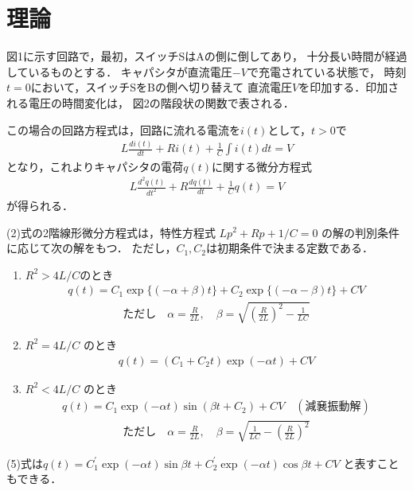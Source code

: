 
\section{理論}

図1に示す回路で，最初，スイッチSはAの側に倒してあり，
十分長い時間が経過しているものとする．
キャパシタが直流電圧$-V$で充電されている状態で，
時刻$t=0$において，スイッチSをBの側へ切り替えて
直流電圧$V$を印加する．印加される電圧の時間変化は，
図2の階段状の関数で表される．

この場合の回路方程式は，回路に流れる電流を$i(t)$として，$t>0$で
\begin{align}
    L \frac{d i(t)}{d t}+R i(t)+\frac{1}{C} \int i(t) d t=V
\end{align}
となり，これよりキャパシタの電荷$q(t)$に関する微分方程式
\begin{align}
    L \frac{d^2 q(t)}{d t^2}+R \frac{d q(t)}{d t}+\frac{1}{C} q(t)=V
\end{align}
が得られる．

(2)式の2階線形微分方程式は，特性方程式 $L p^2+R p+1 / C=0$ 
の解の判別条件に応じて次の解をもつ．
ただし，$C_1, C_2$は初期条件で決まる定数である．

\begin{enumerate}
    \item $R^2>4L/C$のとき
        \begin{align}
            q(t)=C_1 \exp \{(-\alpha+\beta) t\}+C_2 \exp \{(-\alpha-\beta) t\}+C V
        \end{align}
        \begin{align*}
            ただし \quad \alpha=\frac{R}{2 L}, \quad \beta=\sqrt{\left(\frac{R}{2 L}\right)^2-\frac{1}{L C}}
        \end{align*}

    \item $R^2=4 L / C$ のとき
        \begin{align}
            q(t)=\left(C_1+C_2 t\right) \exp (-\alpha t)+C V
        \end{align}

    \item $R^2<4 L / C$ のとき
        \begin{align}
            q(t)=C_1 \exp (-\alpha t) \sin \left(\beta t+C_2\right)+C V\quad(減㐮振動解)
        \end{align}
        \begin{align*}
            ただし \quad \alpha=\frac{R}{2 L}, \quad \beta=\sqrt{\frac{1}{L C}-\left(\frac{R}{2 L}\right)^2}
        \end{align*}
\end{enumerate}

(5)式は$q(t)=C_1^{\prime} \exp (-\alpha t) \sin \beta t+C_2^{\prime} \exp (-\alpha t) \cos \beta t+C V$
と表すこともできる．